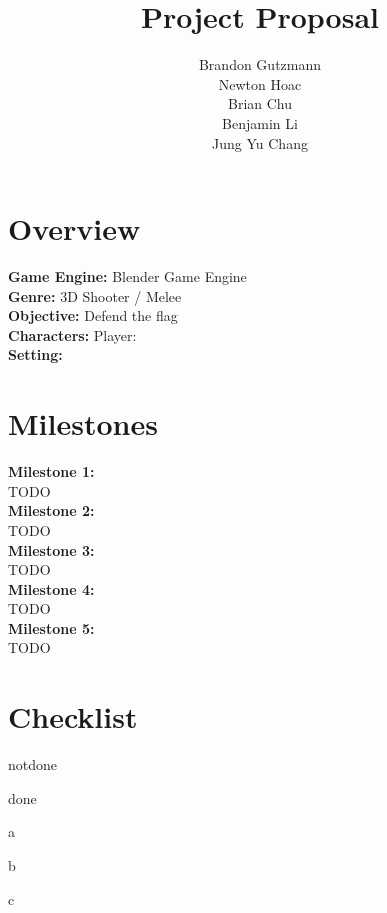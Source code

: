 \documentclass{article}
\title{Project Proposal}
\author{Brandon Gutzmann\\Newton Hoac\\Brian Chu\\Benjamin Li\\Jung Yu Chang}
\newcommand{\cmark}{\ding{51}}%
\newcommand{\done}{\rlap{$\square$}{\raisebox{1pt}{\large\hspace{1pt}\cmark}}%
\hspace{-2.5pt}}
\begin{document}
\maketitle
\section{Overview}
\textbf{Game Engine:} Blender Game Engine
\\
\textbf{Genre:} 3D Shooter / Melee
\\
\textbf{Objective:} Defend the flag
\\
\textbf{Characters:} Player: 
\\
\textbf{Setting:}
\\

\section{Milestones}
\begin{adjustwidth}{2.5em}{0pt}
\textbf{\large Milestone 1:}\\
TODO
\\
\textbf{\large Milestone 2:}\\
TODO
\\
\textbf{\large Milestone 3:}\\
TODO
\\
\textbf{\large Milestone 4:}\\
TODO
\\
\textbf{\large Milestone 5:}\\
TODO
\end{adjustwidth}
\section{Checklist}
\begin{todolist}
\item notdone
\item[\done] done
\item a
\item b
\item c
\end{todolist}
\end{document}
